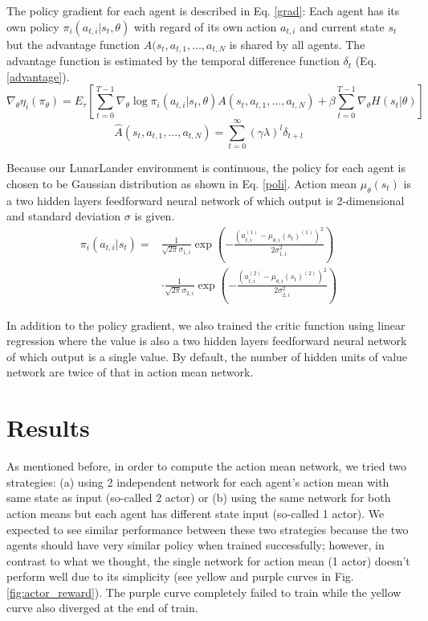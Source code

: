 \documentclass[12pt, letter]{article}
\begin{document}
The policy gradient for each agent is described in Eq. \ref{grad}: Each agent has its own policy $\pi_i(a_{t, i}|s_t, \theta)$ with regard of its own action $a_{t, i}$ and current state $s_t$ but the advantage function $A(s_t, a_{t, 1}, ..., a_{t, N}$ is shared by all agents. The advantage function is estimated by the temporal difference function $\delta_t$ (Eq. \ref{advantage}).
\begin{equation}
\nabla_{\theta}\eta_i(\pi_{\theta}) = E_{\tau}[\sum^{T-1}_{t=0}\nabla_{\theta}\log\pi_i(a_{t, i}|s_t, \theta)A(s_t, a_{t, 1}, ..., a_{t, N}) + \beta\sum^{T-1}_{t=0}\nabla_{\theta}H(s_t|\theta)]
\label{grad}
\end{equation}
\begin{equation}
\hat{A}(s_t, a_{t, 1}, ..., a_{t, N}) = \sum^{\infty}_{t=0} (\gamma \lambda)^l \delta_{t+l}
\label{advantage}
\end{equation}

Because our LunarLander environment is continuous, the policy for each agent is chosen to be Gaussian distribution as shown in Eq. \ref{poli}. Action mean $\mu_{\theta}(s_t)$ is a two hidden layers feedforward neural network of which output is 2-dimensional and standard deviation $\sigma$ is given.
\begin{align}
\pi_i(a_{t, i}|s_t) = & \frac{1}{\sqrt{2\pi} \sigma_{1, i}} \exp( -\frac{(a_{t, i}^{(1)}-\mu_{\theta, i}(s_t)^{(1)})^2}{2\sigma_{1, i}^2}) \nonumber \\
& \cdot \frac{1}{\sqrt{2\pi} \sigma_{2, i}} \exp( -\frac{(a_{t, i}^{(2)}-\mu_{\theta, i}(s_t)^{(2)})^2}{2\sigma_{2, i}^2})
\label{poli}
\end{align}

In addition to the policy gradient, we also trained the critic function using linear regression where the value is also a two hidden layers feedforward neural network of which output is a single value. By default, the number of hidden units of value network are twice of that in action mean network.

\section{Results}

As mentioned before, in order to compute the action mean network, we tried two strategies: (a) using 2 independent network for each agent's action mean with same state as input (so-called 2 actor) or (b) using the same network for both action means but each agent has different state input (so-called 1 actor). We expected to see similar performance between these two strategies because the two agents should have very similar policy when trained successfully; however, in contrast to what we thought, the single network for action mean (1 actor) doesn't perform well due to its simplicity (see yellow and purple curves in Fig. \ref{fig:actor_reward}). The purple curve completely failed to train while the yellow curve also diverged at the end of train.
\end{document}
